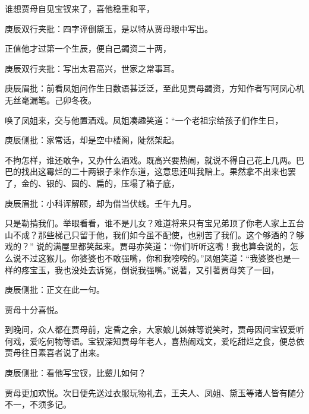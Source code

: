 \begin{parag}


    谁想贾母自见宝钗来了，喜他稳重和平，\begin{note}庚辰双行夹批：四字评倒黛玉，是以特从贾母眼中写出。\end{note}正值他才过第一个生辰，便自己蠲资二十两，\begin{note}庚辰双行夹批：写出太君高兴，世家之常事耳。\end{note}\begin{note}庚辰眉批：前看凤姐问作生日数语甚泛泛，至此见贾母蠲资，方知作者写阿凤心机无丝毫漏笔。己卯冬夜。\end{note}唤了凤姐来，交与他置酒戏。凤姐凑趣笑道：“一个老祖宗给孩子们作生日，\begin{note}庚辰侧批：家常话，却是空中楼阁，陡然架起。\end{note}不拘怎样，谁还敢争，又办什么酒戏。既高兴要热闹，就说不得自己花上几两。巴巴的找出这霉烂的二十两银子来作东道，这意思还叫我赔上。果然拿不出来也罢了，金的、银的、圆的、扁的，压塌了箱子底，\begin{note}庚辰眉批：小科诨解颐，却为借当伏线。壬午九月。\end{note}只是勒掯我们。举眼看看，谁不是儿女？难道将来只有宝兄弟顶了你老人家上五台山不成？那些梯己只留于他，我们如今虽不配使，也别苦了我们。这个够酒的？够戏的？” 说的满屋里都笑起来。贾母亦笑道：“你们听听这嘴！我也算会说的，怎么说不过这猴儿。你婆婆也不敢强嘴，你和我嗙嗙的。”凤姐笑道：“我婆婆也是一样的疼宝玉，我也没处去诉冤，倒说我强嘴。”说著，又引著贾母笑了一回，\begin{note}庚辰侧批：正文在此一句。\end{note}贾母十分喜悦。
\end{parag}


\begin{parag}


    到晚间，众人都在贾母前，定昏之余，大家娘儿姊妹等说笑时，贾母因问宝钗爱听何戏，爱吃何物等语。宝钗深知贾母年老人，喜热闹戏文，爱吃甜烂之食，便总依贾母往日素喜者说了出来。\begin{note}庚辰侧批：看他写宝钗，比颦儿如何？\end{note}贾母更加欢悦。次日便先送过衣服玩物礼去，王夫人、凤姐、黛玉等诸人皆有随分不一，不须多记。
\end{parag}


